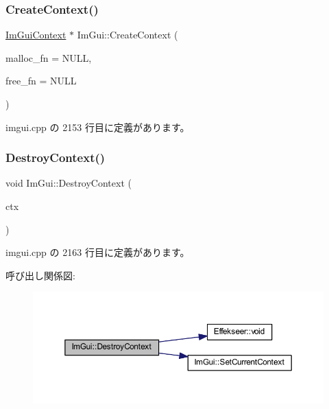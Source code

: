 \mbox{\label{namespace_im_gui_a98a4fecf50da4fb3489cee71a72cc577}} 
\subsubsection{\texorpdfstring{Create\+Context()}{CreateContext()}}
{\footnotesize\ttfamily \mbox{\hyperlink{struct_im_gui_context}{Im\+Gui\+Context}} $\ast$ Im\+Gui\+::\+Create\+Context (\begin{DoxyParamCaption}\item[{void $\ast$($\ast$)(size\+\_\+t)}]{malloc\+\_\+fn = {\ttfamily NULL},  }\item[{void($\ast$)(void $\ast$)}]{free\+\_\+fn = {\ttfamily NULL} }\end{DoxyParamCaption})}



 imgui.\+cpp の 2153 行目に定義があります。

\mbox{\label{namespace_im_gui_a344adba8bd84069dc7425b88306411c7}} 
\subsubsection{\texorpdfstring{Destroy\+Context()}{DestroyContext()}}
{\footnotesize\ttfamily void Im\+Gui\+::\+Destroy\+Context (\begin{DoxyParamCaption}\item[{\mbox{\hyperlink{struct_im_gui_context}{Im\+Gui\+Context}} $\ast$}]{ctx }\end{DoxyParamCaption})}



 imgui.\+cpp の 2163 行目に定義があります。

呼び出し関係図\+:\nopagebreak
\begin{figure}[H]
\begin{center}
\leavevmode
\includegraphics[width=350pt]{namespace_im_gui_a344adba8bd84069dc7425b88306411c7_cgraph}
\end{center}
\end{figure}
\mbox{\label{namespace_im_gui_a4fdcba60dbe3762a144051add234ea48}} 
